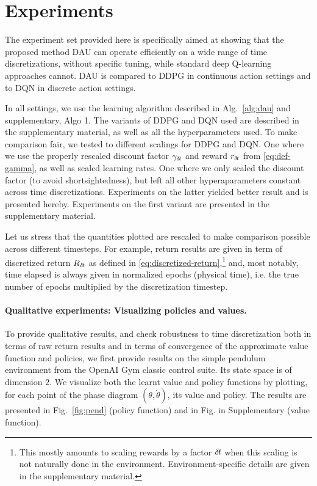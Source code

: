 \section{Experiments}
\label{sec:exp}

The experiment set provided here is specifically aimed at showing that
the proposed method DAU can operate efficiently on a wide range of time
discretizations, without specific tuning, while standard deep Q-learning
approaches cannot. DAU is compared to DDPG in continuous action settings and to DQN in
discrete action settings. 

In all settings, we use the learning algorithm described in
Alg.~\ref{alg:dau} and supplementary, Algo 1. The variants of DDPG and DQN
used are described in the supplementary material, as well as all the hyperparameters
used. To make comparison fair, we tested to different scalings for DDPG and DQN.
One where we use the properly rescaled discount
factor $\gamma_{\delta\hspace{-.1em}t}$ and reward $r_{\delta\hspace{-.1em}t}$ from \eqref{eq:def-gamma},
as well as scaled learning rates. One where we only scaled the discount factor
(to avoid shortsightedness), but left all other hyperaparameters constant
across time discretizations. Experiments on the latter yielded better result
and is presented hereby. Experiments on the first variant are presented in the
supplementary material. 

Let us stress that the quantities plotted are rescaled to make comparison
possible across different timesteps. For example,
return results are given in term of discretized return $R_{\delta\hspace{-.1em}t}$ as defined in \eqref{eq:discretized-return},\footnote{This mostly amounts to scaling rewards
by a factor ${\delta\hspace{-.1em}t}$ when this scaling is not naturally done in the environment. Environment-specific
details are given in the supplementary material.} and, most notably, time elapsed is always given in
normalized epochs (physical time), i.e. the true number of epochs multiplied by the
discretization timestep.


\paragraph{Qualitative experiments: Visualizing policies and values.}
To provide qualitative results, and check robustness to time
discretization both in terms of raw return results and in terms
of convergence of the approximate value function and policies, we first provide results on the simple pendulum environment
from the OpenAI Gym classic control suite.  Its state space is of
dimension $2$. We visualize both the learnt value and policy functions by
plotting, for each point of the phase diagram $(\theta, \dot{\theta})$,
its value and policy. The results are presented in
Fig.~\ref{fig:pend} (policy function) and in Fig. in
Supplementary  (value function).

